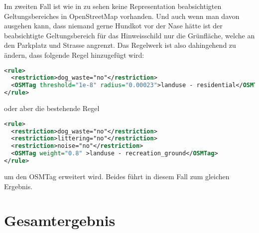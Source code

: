 Im zweiten Fall ist wie in  zu sehen keine Representation
beabsichtigten Geltungsbereiches in OpenStreetMap vorhanden. Und auch wenn man davon
ausgehen kann, dass niemand gerne Hundkot vor der Nase hätte ist der beabsichtigte
Geltungsbereich für das Hinweisschild nur die Grünfläche, welche an den Parkplatz
und Strasse angrenzt.
Das Regelwerk ist also dahingehend zu ändern, dass folgende Regel hinzugefügt wird:
\begin{lstlisting}[language=xml,frame=single]
<rule>
  <restriction>dog_waste="no"</restriction>
  <OSMTag threshold="1e-8" radius="0.00023">landuse - residential</OSMTag>
</rule>
\end{lstlisting}
oder aber die bestehende Regel
\begin{lstlisting}[language=xml,frame=single]
<rule>
  <restriction>dog_waste="no"</restriction>
  <restriction>littering="no"</restriction>
  <restriction>noise="no"</restriction>
  <OSMTag weight="0.8" >landuse - recreation_ground</OSMTag>
</rule>
\end{lstlisting}
um den OSMTag erweitert wird.
Beides führt in diesem Fall zum gleichen Ergebnis.

\section{Gesamtergebnis}
